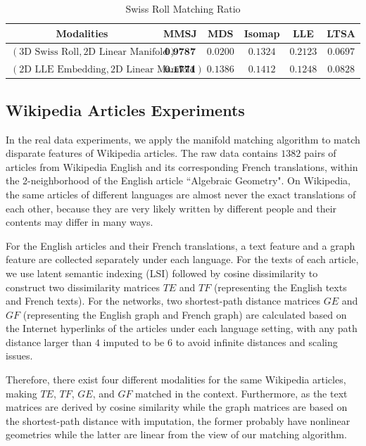 \documentclass[times,twocolumn,final]{elsarticle}
\begin{document}
\begin{table}[htbp]
\centering
\caption{Swiss Roll Matching Ratio}
\label{table:Swiss}
\begin{tabular}{|c||c|c|c|c|c|}
\hline
Modalities & MMSJ & MDS & Isomap & LLE & LTSA \\
\hline
$(\mbox{3D Swiss Roll}, \mbox{2D Linear Manifold})$ & $\textbf{0.9787}$  & $0.0200$ & $0.1324$ & $0.2123$ & $0.0697$\\
\hline
$(\mbox{2D LLE Embedding}, \mbox{2D Linear Manifold})$ & $\textbf{0.1771}$  & $0.1386$ & $0.1412$ & $0.1248$ & $0.0828$\\
\hline
\end{tabular}
\end{table}

\subsection{Wikipedia Articles Experiments}
In the real data experiments, we apply the manifold matching algorithm to match disparate features of Wikipedia articles. The raw data contains $1382$ pairs of articles from Wikipedia English and its corresponding French translations, within the 2-neighborhood of the English article ``Algebraic Geometry". On Wikipedia, the same articles of different languages are almost never the exact translations of each other, because they are very likely written by different people and their contents may differ in many ways.

For the English articles and their French translations, a text feature and a graph feature are collected separately under each language. For the texts of each article, we use latent semantic indexing (LSI) \citep{DeerwesterDumais1990} followed by cosine dissimilarity to construct two dissimilarity matrices $TE$ and $TF$ (representing the English texts and French texts). For the networks, two shortest-path distance matrices $GE$ and $GF$ (representing the English graph and French graph) are calculated based on the Internet hyperlinks of the articles under each language setting, with any path distance larger than $4$ imputed to be $6$ to avoid infinite distances and scaling issues.

Therefore, there exist four different modalities for the same Wikipedia articles, making $TE$, $TF$, $GE$, and $GF$ matched in the context. Furthermore, as the text matrices are derived by cosine similarity while the graph matrices are based on the shortest-path distance with imputation, the former probably have nonlinear geometries while the latter are linear from the view of our matching algorithm.
\end{document}
